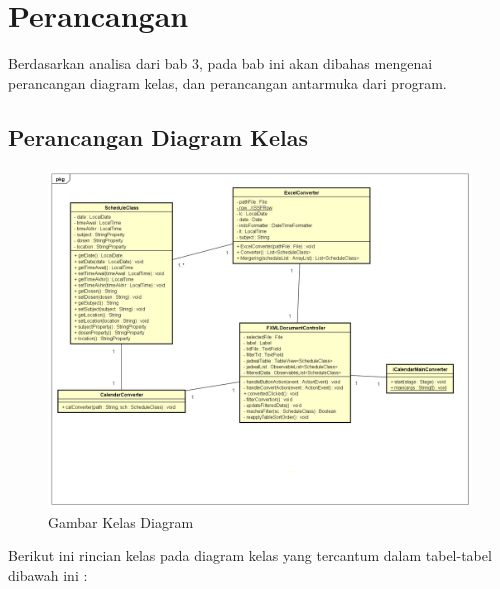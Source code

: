 \chapter{Perancangan}
\label{chap:design}

Berdasarkan analisa dari bab 3, pada bab ini akan dibahas mengenai perancangan diagram kelas, dan perancangan antarmuka dari
program.

\section{Perancangan Diagram Kelas}
\begin{figure}[H]
	\centering
	\includegraphics[scale=0.4]{Gambar/kelas-diagram}
	\caption{Gambar Kelas Diagram}
	\label{fig:pemodelan-kelas}
\end{figure}

Berikut ini rincian kelas pada diagram kelas yang tercantum dalam tabel-tabel dibawah ini :

